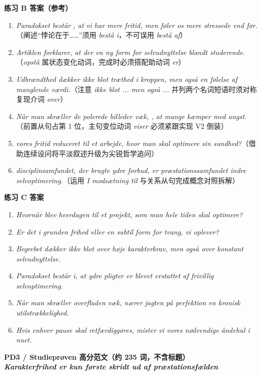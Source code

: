 \begin{answerbox}
\textbf{练习 B 答案（参考）}
\begin{enumerate}
  \item \textit{Paradokset består , at vi har mere fritid, men føler os mere stressede end før.}（阐述“悖论在于……”须用 \textit{bestå i}，不可误用 \textit{bestå af}）
  \item \textit{Artiklen forklarer, at der  en ny form for selvudnyttelse blandt studerende.}（\textit{opstå} 属状态变化动词，完成时必须搭配助动词 \textit{er}）
  \item \textit{Udbrændthed dækker ikke blot  træthed i kroppen, men også  en følelse af manglende værdi.}（注意 \textit{ikke blot ... men også ...} 并列两个名词短语时须对称复现介词 \textit{over}）
  \item \textit{Når man skræller de polerede billeder væk, , at mange kæmper med angst.}（前置从句占第 1 位，主句变位动词 \textit{viser} 必须紧跟实现 V2 倒装）
  \item \textit{ vores fritid reduceret til et arbejde, hvor man skal optimere sin sundhed?}（借助连续设问将平淡叙述升级为尖锐哲学追问）
  \item \textit{ disciplinsamfundet, der brugte ydre forbud, er præstationssamfundet  indre selvoptimering.}（运用 \textit{I modsætning til} 与关系从句完成概念对照拆解）
\end{enumerate}

\textbf{练习 C 答案}
\begin{enumerate}
  \item \textit{Hvornår blev hverdagen til et projekt, som man hele tiden skal optimere?}
  \item \textit{Er det i grunden frihed eller en subtil form for tvang, vi oplever?}
  \item \textit{Begrebet dækker ikke blot over høje karakterkrav, men også over konstant selvudnyttelse.}
  \item \textit{Paradokset består i, at ydre pligter er blevet erstattet af frivillig selvoptimering.}
  \item \textit{Når man skræller overfladen væk, nærer jagten på perfektion en kronisk utilstrækkelighed.}
  \item \textit{Hvis enhver pause skal retfærdiggøres, mister vi vores nødvendige åndehul i nuet.}
\end{enumerate}

\textbf{PD3 / Studieprøven 高分范文（约 235 词，不含标题）}\\
\textit{\textbf{Karakterfrihed er kun første skridt ud af præstationsfælden}}


\end{answerbox}
